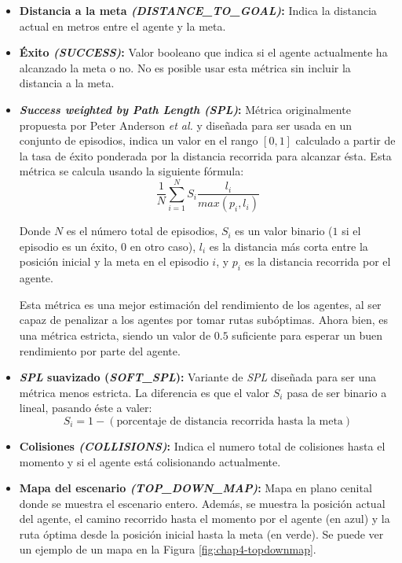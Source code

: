 \begin{itemize}
	\item \textbf{Distancia a la meta \textit{(DISTANCE{\_}TO{\_}GOAL)}:} Indica la distancia actual en metros entre el agente y la meta.
	\item \textbf{Éxito \textit{(SUCCESS)}:} Valor booleano que indica si el agente actualmente ha alcanzado la meta o no. No es posible usar esta métrica sin incluir la distancia a la meta.
	\item \textbf{\textit{Success weighted by Path Length (SPL)}:} Métrica originalmente propuesta por Peter Anderson \textit{et al.} \cite{DBLP:journals/corr/abs-1807-06757} y diseñada para ser usada en un conjunto de episodios, indica un valor en el rango $[0, 1]$ calculado a partir de la tasa de éxito ponderada por la distancia recorrida para alcanzar ésta. Esta métrica se calcula usando la siguiente fórmula:
	\[ \frac{1}{N} \sum^{N}_{i=1} S_{i} \frac{l_i}{max(p_i,l_i)} \]
	
	Donde $N$ es el número total de episodios, $S_i$ es un valor binario ($1$ si el episodio es un éxito, 0 en otro caso), $l_i$ es la distancia más corta entre la posición inicial y la meta en el episodio $i$, y $p_i$ es la distancia recorrida por el agente.
	
	Esta métrica es una mejor estimación del rendimiento de los agentes, al ser capaz de penalizar a los agentes por tomar rutas subóptimas. Ahora bien, es una métrica estricta, siendo un valor de $0.5$ suficiente para esperar un buen rendimiento por parte del agente.
	
	\item \textbf{\textit{SPL} suavizado (\textit{SOFT{\_}SPL}):} Variante de \textit{SPL} diseñada para ser una métrica menos estricta. La diferencia es que el valor $S_i$ pasa de ser binario a lineal, pasando éste a valer:
	\[S_i = 1 - (\text{porcentaje de distancia recorrida hasta la meta})\]
	\item \textbf{Colisiones \textit{(COLLISIONS)}:} Indica el numero total de colisiones hasta el momento y si el agente está colisionando actualmente.
	\item \textbf{Mapa del escenario \textit{(TOP{\_}DOWN{\_}MAP)}:} Mapa en plano cenital donde se muestra el escenario entero. Además, se muestra la posición actual del agente, el camino recorrido hasta el momento por el agente (en azul) y la ruta óptima desde la posición inicial hasta la meta (en verde). Se puede ver un ejemplo de un mapa en la Figura \ref{fig:chap4-topdownmap}.
	

\end{itemize}
